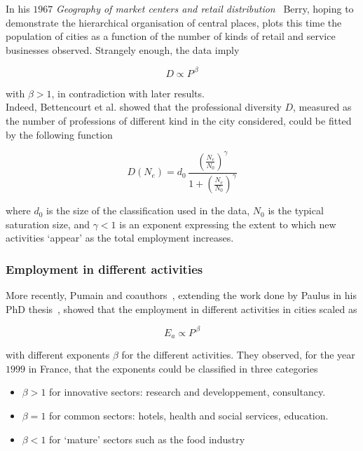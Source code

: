 In his $1967$ \emph{Geography of market centers and retail
distribution}~\cite{Berry:1967} Berry, hoping to demonstrate the hierarchical
organisation of central places, plots this time the population of cities as a
function of the number of kinds of retail and service businesses observed.
Strangely enough, the data imply

\begin{equation}
    D \propto P^{\, \beta}
\end{equation}

with $\beta > 1$, in contradiction with later results.\\

Indeed, Bettencourt et al.\cite{Bettencourt:2014} showed that the professional
diversity $D$, measured as the number of professions of different kind in the
city considered, could be fitted by the following function

\begin{equation}
    D(N_e) = d_0\, \frac{\left(\frac{N_e}{N_0}\right)^\gamma}{1+\left(\frac{N_e}{N_0}\right)^\gamma}
\end{equation}

where $d_0$ is the size of the classification used in the data, $N_0$ is the
typical saturation size, and $\gamma < 1$ is an exponent expressing the extent to
which new activities `appear' as the total employment increases. 

\subsubsection{Employment in different activities}
\label{ssub:employment_in_different_activities}

More recently, Pumain and coauthors~\cite{Pumain:2006}, extending the work done
by Paulus in his PhD thesis~\cite{Paulus:2004}, showed that the
employment in different activities in cities scaled as

\begin{equation}
    E_a \propto P^{\,\beta}
\end{equation}

with different exponents $\beta$ for the different activities. They observed,
for the year $1999$ in France, that the exponents could be classified in three
categories

\begin{itemize}
    \item $\beta > 1$ for innovative sectors: research and developpement,
        consultancy.
    \item $\beta = 1$ for common sectors: hotels, health and social services,
        education.
    \item $\beta < 1$ for `mature' sectors such as the food industry
\end{itemize}

